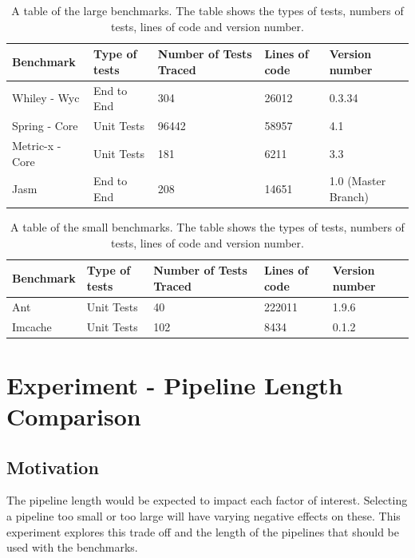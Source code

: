 \documentclass[11pt
              , a4paper
              , twoside
              , openright
              ]{report}
\newcommand{\rom}[1]{\uppercase\expandafter{\romannumeral #1\relax}}
\begin{document}
\begin{table}[H]
\centering
\begin{tabular}{|l|l|l|l|l|}
\hline
{\bf Benchmark}    & {\bf Type of tests}   &  {\bf Number of Tests Traced} & {\bf Lines of code} & {\bf Version number}   \\ \hline
Whiley - Wyc      & End to End  &    304   &   26012       &       0.3.34   \\ \hline
Spring - Core   & Unit Tests  &  96442  &    58957      & 4.1 \\ \hline
Metric-x - Core &  Unit Tests  &  181 &    6211      & 3.3 \\ \hline
Jasm              &   End to End   &  208     &     14651     & 1.0 (Master Branch) \\ \hline

\end{tabular}
\caption{A table of the large benchmarks. The table shows the types of tests, numbers of tests, lines of code and version number.}
\label{large_test}
\end{table}

\begin{table}[H]
\centering
\begin{tabular}{|l|l|l|l|l|}
\hline
{\bf Benchmark} & {\bf Type of tests}   & {\bf Number of Tests Traced} & {\bf Lines of code} & {\bf Version number}  \\ \hline
Ant             &   Unit Tests    &     40     & 222011 & 1.9.6 \\ \hline
Imcache &       Unit Tests    &    102        & 8434  & 0.1.2 \\ \hline
\end{tabular}
\caption{A table of the small benchmarks. The table shows the types of tests, numbers of tests, lines of code and version number.}
\label{small_test}
\end{table}

\section{Experiment \rom{1} - Pipeline Length Comparison }
\label{sec:pipelineEva}

\subsection{Motivation}
The pipeline length would be expected to impact each factor of interest. Selecting a pipeline too small or too large will have varying negative effects on these. This experiment explores this trade off and the length of the pipelines that should be used with the benchmarks.
\end{document}
